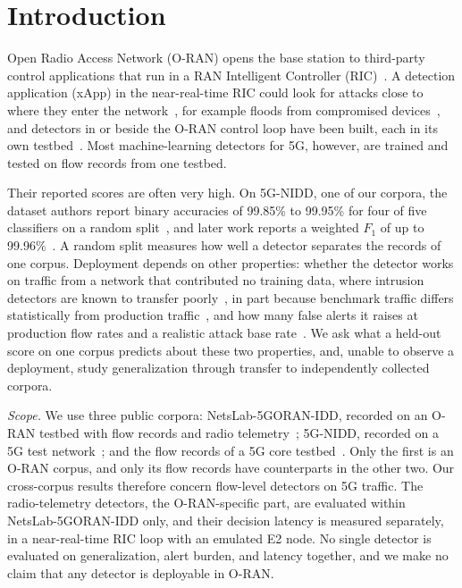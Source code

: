\titlepgskip=-21pt

\maketitle

\section{Introduction}
\label{sec:intro}

Open Radio Access Network (O-RAN) opens the base station to third-party control applications that run in a RAN Intelligent Controller (RIC)~\cite{polese2023understanding,abdalla2022toward,niknam2022intelligent}. A detection application (xApp) in the near-real-time RIC could look for attacks close to where they enter the network~\cite{bonati2021intelligence,polese2023understanding}, for example floods from compromised devices~\cite{antonakakis2017mirai,kolias2017ddos}, and detectors in or beside the O-RAN control loop have been built, each in its own testbed~\cite{wen2024spector,scalingi2024detran}. Most machine-learning detectors for 5G, however, are trained and tested on flow records from one testbed.

Their reported scores are often very high. On 5G-NIDD, one of our corpora, the dataset authors report binary accuracies of 99.85\% to 99.95\% for four of five classifiers on a random split~\cite{samarakoon2022niddarxiv,siriwardhana2025descriptor}, and later work reports a weighted $F_1$ of up to 99.96\%~\cite{ilias2024moe5g}. A random split measures how well a detector separates the records of one corpus. Deployment depends on other properties: whether the detector works on traffic from a network that contributed no training data, where intrusion detectors are known to transfer poorly~\cite{layeghy2022generalisability}, in part because benchmark traffic differs statistically from production traffic~\cite{layeghy2023benchmarking}, and how many false alerts it raises at production flow rates and a realistic attack base rate~\cite{axelsson2000baserate,sommer2010outside}. We ask what a held-out score on one corpus predicts about these two properties, and, unable to observe a deployment, study generalization through transfer to independently collected corpora.

\emph{Scope.} We use three public corpora: NetsLab-5GORAN-IDD, recorded on an O-RAN testbed with flow records and radio telemetry~\cite{abedzadeh2025netslab}; 5G-NIDD, recorded on a 5G test network~\cite{samarakoon2022nidd}; and the flow records of a 5G core testbed~\cite{nugraha2025fivegdatasets}. Only the first is an O-RAN corpus, and only its flow records have counterparts in the other two. Our cross-corpus results therefore concern flow-level detectors on 5G traffic. The radio-telemetry detectors, the O-RAN-specific part, are evaluated within NetsLab-5GORAN-IDD only, and their decision latency is measured separately, in a near-real-time RIC loop with an emulated E2 node. No single detector is evaluated on generalization, alert burden, and latency together, and we make no claim that any detector is deployable in O-RAN.

